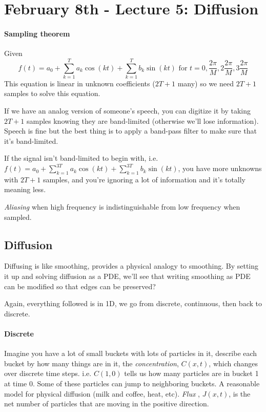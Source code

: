 \pagebreak

\section{February 8th - Lecture 5: Diffusion}
\label{sec:lecture-5}

\paragraph{Sampling theorem}
\label{sec:sampling-theorem}
Given $$f(t) = a_0 + \sum_{k=1}^T a_k \cos(kt) + \sum_{k=1}^Tb_k\sin(
kt) \text{ for } t=0, \frac{2\pi}{M}, 2\frac{2\pi}{M}, 3\frac{2\pi}{M}$$
This equation is linear in unknown coefficients ($2T+1$ many) so we need
$2T+1$ samples to solve this equation.

If we have an analog version of someone's speech, you can digitize it
by taking $2T+1$ samples knowing they are band-limited (otherwise
we'll lose information). Speech is fine but the best thing is to apply a band-pass filter to make sure that
it's band-limited.

If the signal isn't band-limited to begin with, i.e. 
$f(t) = a_0 + \sum_{k=1}^{3T} a_k \cos(kt) + \sum_{k=1}^{3T} b_k\sin(
kt) $, you have more unknowns with $2T+1$ samples, and you're ignoring
a lot of information and it's totally meaning less.

\emph{Aliasing} when high frequency is indistinguishable from low
frequency when sampled.

\subsection{Diffusion}
\label{sec:diffusion}
Diffusing is like smoothing, provides a physical analogy to
smoothing. By setting it up and solving diffusion as a PDE, we'll see that
writing smoothing as PDE can be modified so that edges can be
preserved?

Again, everything followed is in 1D, we go from discrete, continuous,
then back to discrete.

\paragraph{Discrete}
\label{sec:discrete}
Imagine you have a lot of small buckets with lots of particles in it,
describe each bucket by how many things are in it, the
\emph{concentration}, $C(x,t)$, which changes over discrete time steps. 
i.e. $C(1,0)$ tells us how many particles are in bucket 1 at time 0.
Some of these particles can jump to neighboring buckets. A reasonable
model for physical diffusion (milk and coffee, heat, etc).
\emph{Flux} , $J(x,t)$, is the net number of particles that are moving in the
positive direction.


